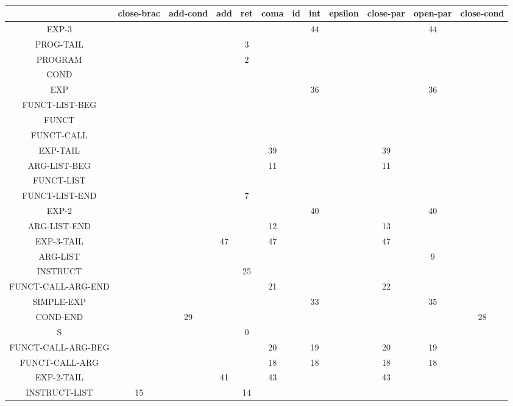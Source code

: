 \documentclass[a4paper,10pt]{article}
\begin{document}
 ~\\
 
\hspace{-3.0cm}\begin{tabular}{|c|c|c|c|c|c|c|c|c|c|c|c|}	
\hline
&	close-brac&	add-cond&	add&	ret&	coma& id&	int&	epsilon&	close-par&	open-par&	close-cond \\ \hline
EXP-3				& 	& 	& 	& 	& 	& 	& 44& 	& 	& 44& 	  \\ \hline 
PROG-TAIL			& 	& 	& 	& 3	& 	& 	& 	& 	& 	& 	& 	 \\ \hline 
PROGRAM				& 	& 	& 	& 2	& 	& 	& 	& 	& 	& 	& 	 \\ \hline 
COND				& 	& 	& 	& 	& 	& 	& 	& 	& 	& 	& 	 \\ \hline 
EXP					& 	& 	& 	& 	& 	& 	& 36& 	& 	& 36& 	 \\ \hline 
FUNCT-LIST-BEG		& 	& 	& 	& 	& 	& 	& 	& 	& 	& 	& 	  \\ \hline 
FUNCT				& 	& 	& 	& 	& 	& 	&	& 	& 	& 	& 	  \\ \hline 
FUNCT-CALL			& 	& 	& 	& 	& 	& 	& 	& 	& 	& 	& 	  \\ \hline 
EXP-TAIL			& 	& 	& 	& 	& 39& 	& 	& 	& 39& 	& 	\\ \hline 
ARG-LIST-BEG		& 	& 	& 	& 	& 11& 	& 	& 	& 11& 	& 	 \\ \hline 
FUNCT-LIST			& 	& 	& 	& 	& 	& 	& 	& 	& 	& 	& 	 \\ \hline 
FUNCT-LIST-END		& 	& 	& 	& 7	& 	& 	& 	& 	& 	& 	& 	  \\ \hline 
EXP-2				& 	& 	& 	& 	& 	& 	& 40& 	& 	& 40& 	  \\ \hline 
ARG-LIST-END		& 	& 	& 	& 	& 12& 	& 	& 	& 13& 	& 	 \\ \hline 
EXP-3-TAIL			& 	& 	& 47& 	& 47& 	& 	& 	& 47& 	& 	\\ \hline 
ARG-LIST			& 	&	& 	& 	& 	& 	& 	& 	& 	& 9	& 	  \\ \hline 
INSTRUCT			& 	& 	& 	& 25&	& 	& 	& 	& 	& 	& 	  \\ \hline 
FUNCT-CALL-ARG-END	& 	& 	& 	& 	& 21& 	& 	& 	& 22& 	& 	  \\ \hline 
SIMPLE-EXP			& 	& 	& 	& 	& 	&	& 33& 	& 	& 35& 	 \\ \hline 
COND-END			& 	& 29& 	& 	& 	& 	& 	& 	& 	& 	& 28  \\ \hline 
S					& 	& 	& 	& 0	& 	& 	& 	& 	& 	& 	& 	\\ \hline 
FUNCT-CALL-ARG-BEG	& 	& 	& 	& 	& 20& 	& 19& 	& 20& 19& 	  \\ \hline 
FUNCT-CALL-ARG		& 	& 	& 	& 	& 18& 	& 18& 	& 18& 18& 	 \\ \hline 
EXP-2-TAIL			& 	& 	& 41& 	& 43& 	&	& 	& 43& 	& 	 \\ \hline 
INSTRUCT-LIST		& 15& 	& 	& 14& 	& 	& 	& 	& 	& 	& 	 \\ \hline 

\end{tabular} 
 
\end{document}
